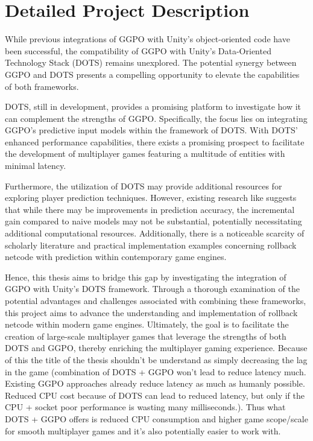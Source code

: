 
\chapter{Detailed Project Description}

While previous integrations of GGPO with Unity's object-oriented code have been successful, the compatibility of GGPO with Unity's Data-Oriented Technology Stack (DOTS) remains unexplored. The potential synergy between GGPO and DOTS presents a compelling opportunity to elevate the capabilities of both frameworks.

DOTS, still in development, provides a promising platform to investigate how it can complement the strengths of GGPO. Specifically, the focus lies on integrating GGPO's predictive input models within the framework of DOTS. With DOTS' enhanced performance capabilities, there exists a promising prospect to facilitate the development of multiplayer games featuring a multitude of entities with minimal latency.

Furthermore, the utilization of DOTS may provide additional resources for exploring player prediction techniques. However, existing research like \cite{Improving_prediction} suggests that while there may be improvements in prediction accuracy, the incremental gain compared to naive models may not be substantial, potentially necessitating additional computational resources. Additionally, there is a noticeable scarcity of scholarly literature and practical implementation examples concerning rollback netcode with prediction within contemporary game engines.

Hence, this thesis aims to bridge this gap by investigating the integration of GGPO with Unity's DOTS framework. Through a thorough examination of the potential advantages and challenges associated with combining these frameworks, this project aims to advance the understanding and implementation of rollback netcode within modern game engines. Ultimately, the goal is to facilitate the creation of large-scale multiplayer games that leverage the strengths of both DOTS and GGPO, thereby enriching the multiplayer gaming experience. Because of this the title of the thesis shouldn't be understand as simply decreasing the lag in the game (combination of DOTS + GGPO won't lead to reduce latency much. Existing GGPO approaches already reduce latency as much as humanly possible. Reduced CPU cost because of DOTS can lead to reduced latency, but only if the CPU + socket poor performance is wasting many milliseconds.). Thus what DOTS + GGPO offers is reduced CPU consumption and higher game scope/scale for smooth multiplayer games and it's also potentially easier to work with.

